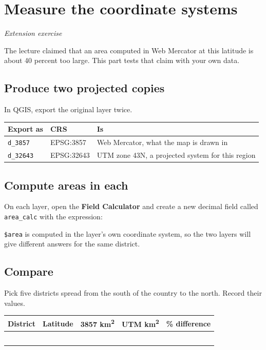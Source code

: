 \documentclass{article}
\newcommand{\cd}[1]{\texttt{#1}}
\begin{document}
\section{Measure the coordinate systems}
\textit{Extension exercise}

The lecture claimed that an area computed in Web Mercator at this
latitude is about 40 percent too large. This part tests that claim with
your own data.

\subsection{Produce two projected copies}

In QGIS, export the original layer twice.

\begin{tabularx}{\textwidth}{@{}L{4.2cm} L{3cm} X@{}}
\toprule
\textbf{Export as} & \textbf{CRS} & \textbf{Is} \\
\midrule
\cd{d\_3857}  & EPSG:3857  & Web Mercator, what the map is drawn in \\
\cd{d\_32643} & EPSG:32643 & UTM zone 43N, a projected system for this region \\
\bottomrule
\end{tabularx}

\subsection{Compute areas in each}

On each layer, open the \textbf{Field Calculator} and create a new
decimal field called \cd{area\_calc} with the expression:


\cd{\$area} is computed in the layer's own coordinate system, so the two
layers will give different answers for the same district.

\subsection{Compare}

Pick five districts spread from the south of the country to the north.
Record their values.

\vspace{.6em}
\begin{tabularx}{\textwidth}{@{}X r r r r@{}}
\toprule
\textbf{District} & \textbf{Latitude} & \textbf{3857 km\textsuperscript{2}}
& \textbf{UTM km\textsuperscript{2}} & \textbf{\% difference} \\
\midrule
 & & & & \\
 & & & & \\
 & & & & \\
 & & & & \\
 & & & & \\
\bottomrule
\end{tabularx}
\end{document}
